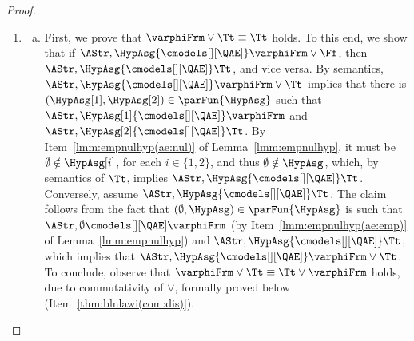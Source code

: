 \documentclass[authoryear]{elsarticle}
\newcommand{\EmpHypAsg}{\emptyset}
\newcommand{\EAmodels}{{\cmodels[][\QEA]}}
\newcommand{\AEmodels}{{\cmodels[][\QAE]}}
\begin{document}
\begin{proof}
\begin{enumerate}[1)]
\begin{enumerate}[a)]
    \item
      First, we prove that $\varphiFrm \land \Tt \equiv \varphiFrm$ holds.
      To this end, we show that if $\AStr, \HypAsg \EAmodels \varphiFrm \land
      \Tt$, then $\AStr, \HypAsg \EAmodels \varphiFrm$, and vice versa.
      By semantics, $\AStr, \HypAsg \EAmodels \varphiFrm \land \Tt$ implies that
      for all $(\HypAsg[1], \HypAsg[2]) \in \parFun{\HypAsg}$, it holds that
      $\AStr, \HypAsg[1] \EAmodels \varphiFrm$ or $\AStr, \HypAsg[2] \EAmodels
      \Tt$. In particular, since $(\HypAsg, \EmpHypAsg) \in \parFun{\HypAsg}$
      and, by Item~\ref{lmm:empnulhyp(ea:emp)} of Lemma~\ref{lmm:empnulhyp},
      $\AStr, \EmpHypAsg \not\cmodels[][\QEA] \Tt$, we have that $\AStr,
      \HypAsg \EAmodels \varphiFrm$.
      Conversely, assume $\AStr, \HypAsg \EAmodels \varphiFrm$ and let
      $(\HypAsg[1], \HypAsg[2]) \in \parFun{\HypAsg}$.
      If $\HypAsg[1] = \HypAsg$, then $\AStr, \HypAsg[1] \EAmodels \varphiFrm$;
      if $\HypAsg[1] \neq \HypAsg$, then $\HypAsg[2] \neq \emptyset$, and thus,
      by semantics of $\Tt$, it holds that $\AStr, \HypAsg[2] \EAmodels \Tt$.
      Therefore, for every $(\HypAsg[1], \HypAsg[2]) \in \parFun{\HypAsg}$, it
      holds that $\AStr, \HypAsg[1] \EAmodels \varphiFrm$ or $\AStr, \HypAsg[2]
      \cmodels[][\QEA] \Tt$, which, by semantics of $\land$, implies $\AStr,
      \HypAsg \EAmodels \varphiFrm \land \Tt$.
      To conclude, observe that $\varphiFrm \land \Tt \equiv \Tt \land
      \varphiFrm$ holds, due to commutativity of $\land$, formally proved below
      (Item~\ref{thm:blnlawi(com:con)}).
    \end{enumerate}

  \item
    \begin{enumerate}[a)]
    \item
      First, we prove that $\varphiFrm \vee \Tt \equiv \Tt$ holds.
      To this end, we show that if $\AStr, \HypAsg \AEmodels \varphiFrm \vee
      \Ff$, then $\AStr, \HypAsg \AEmodels \Tt$, and vice versa.
      By semantics, $\AStr, \HypAsg \AEmodels \varphiFrm \vee \Tt$ implies that
      there is $(\HypAsg[1], \HypAsg[2]) \in \parFun{\HypAsg}$ such  that
      $\AStr, \HypAsg[1] \AEmodels \varphiFrm$ and $\AStr, \HypAsg[2] \AEmodels
      \Tt$.
      By Item~\ref{lmm:empnulhyp(ae:nul)} of Lemma~\ref{lmm:empnulhyp}, it must
      be $\emptyset \notin \HypAsg[i]$, for each $i\in\{1,2\}$, and thus
      $\emptyset \notin \HypAsg$, which, by semantics of $\Tt$, implies $\AStr,
      \HypAsg \AEmodels \Tt$.
      Conversely, assume $\AStr, \HypAsg \AEmodels \Tt$.
      The claim follows from the fact that $(\EmpHypAsg,\HypAsg) \in
      \parFun{\HypAsg}$ is such that $\AStr, \EmpHypAsg \AEmodels \varphiFrm$
      (by Item~\ref{lmm:empnulhyp(ae:emp)} of Lemma~\ref{lmm:empnulhyp}) and
      $\AStr, \HypAsg \AEmodels \Tt$, which implies that $\AStr, \HypAsg
      \AEmodels \varphiFrm \vee \Tt$.
      To conclude, observe that $\varphiFrm \vee \Tt \equiv \Tt \vee
      \varphiFrm$ holds, due to commutativity of $\vee$, formally proved below
      (Item~\ref{thm:blnlawi(com:dis)}).


\end{enumerate}
\end{enumerate}
\end{proof}
\end{document}

